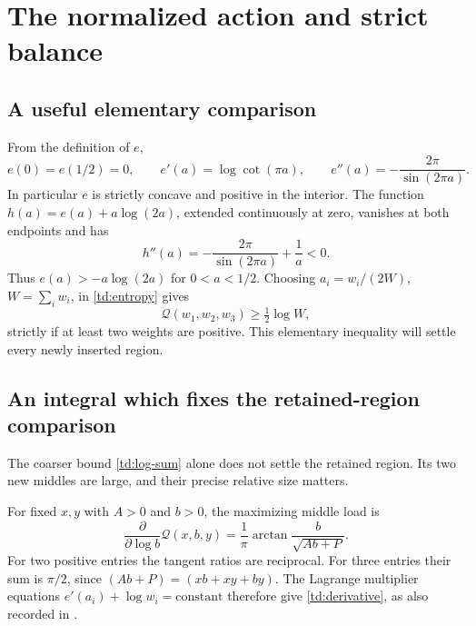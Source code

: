 \documentclass[11pt]{article}
\numberwithin{equation}{section}
\theoremstyle{definition}
\newcommand{\calQ}{\mathcal Q}
\begin{document}
\section{The normalized action and strict balance}

\subsection{A useful elementary comparison}

From the definition of \(e\),
\[
 e(0)=e(1/2)=0,\qquad e'(a)=\log\cot(\pi a),\qquad
 e''(a)=-\frac{2\pi}{\sin(2\pi a)}.
\]
In particular \(e\) is strictly concave and positive in the
interior. The function
\(h(a)=e(a)+a\log(2a)\), extended continuously at zero,
vanishes at both endpoints and has
\[
 h''(a)=-\frac{2\pi}{\sin(2\pi a)}+\frac1a<0.
 \]
Thus \(e(a)>-a\log(2a)\) for \(0<a<1/2\).
Choosing \(a_i=w_i/(2W)\), \(W=\sum_iw_i\), in
\eqref{td:entropy} gives
\begin{equation}\label{td:log-sum}
 \calQ(w_1,w_2,w_3)\ge\tfrac12\log W,
\end{equation}
strictly if at least two weights are positive. This elementary
inequality will settle every newly inserted region.

\subsection{An integral which fixes the retained-region comparison}

The coarser bound \eqref{td:log-sum} alone does not settle the
retained region. Its two new middles are large, and their precise
relative size matters.

For fixed \(x,y\) with \(A>0\) and \(b>0\), the maximizing middle
load is
\begin{equation}\label{td:derivative}
 \frac{\partial}{\partial\log b}\calQ(x,b,y)
       =\frac1\pi\arctan\frac{b}{\sqrt{Ab+P}} .
\end{equation}
For two positive entries the tangent ratios are reciprocal.
For three entries their sum is \(\pi/2\), since
\((Ab+P)=(xb+xy+by)\). The Lagrange multiplier equations
\(e'(a_i)+\log w_i=\text{constant}\) therefore give
\eqref{td:derivative}, as also recorded in
\cite[Lemma 4.1]{Planar}.
\end{document}
